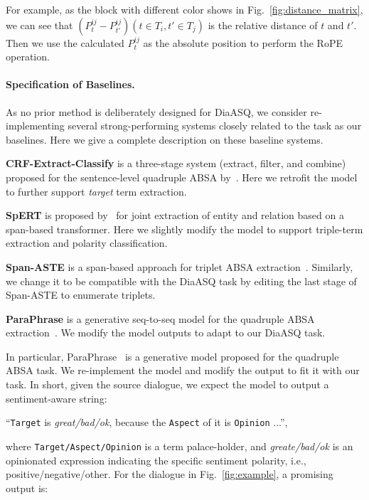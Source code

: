 \documentclass[11pt]{article}
\begin{document}
For example, as the block with different color shows in Fig.~\ref{fig:distance_matrix}, we can see that $(P^{ij}_t-P^{ij}_{t'})(t\in T_i, t'\in T_j)$ is the relative distance of $t$ and $t'$.
Then we use the calculated $P^{ij}_t$ as the absolute position to perform the RoPE operation.

\paragraph{Specification of Baselines.}

As no prior method is deliberately designed for DiaASQ, we consider re-implementing several strong-performing systems closely related to the task as our baselines.
Here we give a complete description on these baseline systems.

\begin{compactitem}
  \item \textbf{CRF-Extract-Classify} is a three-stage system (extract, filter, and combine) proposed for the sentence-level quadruple ABSA by~\citet{CaiXY20}. 
  Here we retrofit the model to further support \emph{target} term extraction.
  \item \textbf{SpERT} is proposed by~\citet{EbertsU20} for joint extraction of entity and relation based on a span-based transformer.
  Here we slightly modify the model to support triple-term extraction and polarity classification.
  \item \textbf{Span-ASTE} is a span-based approach for triplet ABSA extraction~\cite{XuCB20}.
  Similarly, we change it to be compatible with the DiaASQ task by editing the last stage of Span-ASTE to enumerate triplets.
  \item \textbf{ParaPhrase} is a generative seq-to-seq model for the quadruple ABSA extraction~\cite{ZhangD0YBL21}.
  We modify the model outputs to adapt to our DiaASQ task. 
\end{compactitem}

In particular, ParaPhrase~\cite{ZhangD0YBL21} is a generative model proposed for the quadruple ABSA task.
We re-implement the model and modify the output to fit it with our task.
In short, given the source dialogue, we expect the model to output a sentiment-aware string:

``\texttt{Target} is \textit{great/bad/ok}, because the \texttt{Aspect} of it is \texttt{Opinion} ...'', 

\noindent where \texttt{Target/Aspect/Opinion} is a term palace-holder, and \textit{greate/bad/ok} is an opinionated expression indicating the specific sentiment polarity, i.e.,  positive/negative/other.
For the dialogue in Fig.~\ref{fig:example}, a promising output is:
\end{document}
